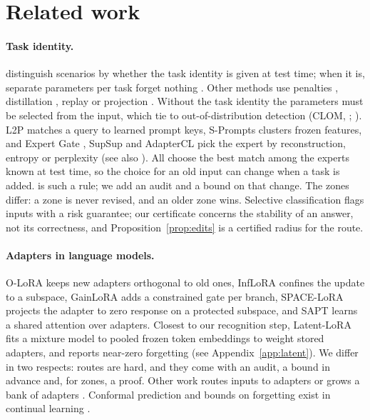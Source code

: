 \section{Related work}
\label{sec:related}

\paragraph{Task identity.} \citet{vandeven2019three} distinguish scenarios by whether the task identity
is given at test time; when it is, separate parameters per task forget nothing
\citep{rusu2016progressive,mallya2018packnet,serra2018hat,razdaibiedina2023progressive}. Other methods
use penalties \citep{kirkpatrick2017ewc}, distillation \citep{li2016lwf}, replay \citep{shin2017dgr} or
projection \citep{saha2021gpm}. Without the task identity the parameters must be selected from the
input, which \citet{kim2022theoretical} tie to out-of-distribution detection (CLOM,
\citealp{kim2022clom}; \citealp{lee2018mahalanobis}). L2P \citep{wang2022l2p} matches a query to learned
prompt keys, S-Prompts \citep{wang2022sprompts} clusters frozen features, and Expert Gate
\citep{aljundi2017expertgate}, SupSup \citep{wortsman2020supsup} and AdapterCL
\citep{madotto2021adaptercl} pick the expert by reconstruction, entropy or perplexity (see also
\citealp{wang2023hide,yu2024moeadapters,zhao2024loraretriever}). All choose the best match among the
experts known at test time, so the choice for an old input can change when a task is added.
\recog{} is such a rule; we add an audit and a bound on that change. The zones differ: a zone is
never revised, and an older zone wins. Selective classification
\citep{geifman2017selective} flags inputs with a risk guarantee; our certificate concerns the
stability of an answer, not its correctness, and Proposition~\ref{prop:edits} is a certified radius
\citep{cohen2019smoothing} for the route.

\paragraph{Adapters in language models.} O-LoRA \citep{wang2023olora} keeps new adapters orthogonal to
old ones, InfLoRA \citep{liang2024inflora} confines the update to a subspace, GainLoRA
\citep{liang2025gainlora} adds a constrained gate per branch, SPACE-LoRA \citep{spacelora2026} projects
the adapter to zero response on a protected subspace, and SAPT \citep{zhao2024sapt} learns a shared
attention over adapters. Closest to our recognition step, Latent-LoRA \citep{latentlora2026} fits a
mixture model to pooled frozen token embeddings to weight stored adapters, and reports near-zero
forgetting (see Appendix~\ref{app:latent}). We differ in two respects: routes are hard, and they come with an audit, a bound in
advance and, for zones, a proof. Other work routes inputs to adapters
\citep{lorauter2026,logo2025} or grows a bank of adapters \citep{read2026}. Conformal prediction and bounds on forgetting exist in continual learning \citep{gao2025conformalcl,friedman2024forgettingbounds}.

